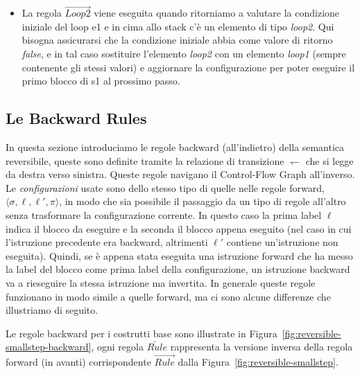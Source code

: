 \documentclass{article}
\theoremstyle{plain}
\theoremstyle{definition}
\theoremstyle{plain}
\def \config#1{\langle #1 \rangle}
\newcommand{\s}{\pi}
\newcommand{\lh}{\leftharpoondown}
\begin{document}
\begin{itemize}
\item La regola $\overrightarrow{\mathit{Loop2}}$ viene eseguita quando ritorniamo a valutare la condizione iniziale del loop e1 e in cima allo stack c'è un elemento di tipo \emph{loop2}. Qui bisogna assicurarsi che la condizione iniziale abbia come valore di ritorno \emph{false}, e in tal caso sostituire l'elemento \emph{loop2} con un elemento \emph{loop1} (sempre contenente gli stessi valori) e aggiornare la configurazione per poter eseguire il primo blocco di s1 al prossimo passo.

\end{itemize}

\subsection{Le Backward Rules}

In questa sezione introduciamo le regole backward (all'indietro) della semantica reversibile, queste sono definite tramite la relazione di transizione $\lh$ che si legge da destra verso sinistra. Queste regole navigano il Control-Flow Graph all'inverso. Le \emph{configurazioni} usate sono dello stesso tipo di quelle nelle regole forward, $\config{\sigma,\ell,\ell',\s}$, in modo che sia possibile il passaggio da un tipo di regole all'altro senza trasformare la configurazione corrente. In questo caso la prima label $\ell$ indica il blocco da eseguire e la seconda il blocco appena eseguito (nel caso in cui l'istruzione precedente era backward, altrimenti $\ell'$ contiene un'istruzione non eseguita). Quindi, se è appena stata eseguita una istruzione forward che ha messo la label del blocco come prima label della configurazione, un istruzione backward va a rieseguire la stessa istruzione ma invertita. In generale queste regole funzionano in modo simile a quelle forward, ma ci sono alcune differenze che illustriamo di seguito.

Le regole backward per i costrutti base sono illustrate in Figura~\ref{fig:reversible-smallstep-backward}, ogni regola $\overleftarrow{\mathit{Rule}}$ rappresenta la versione inversa della regola forward (in avanti) corrispondente $\overrightarrow{{Rule}}$ dalla Figura~\ref{fig:reversible-smallstep}.
%
\end{document}
